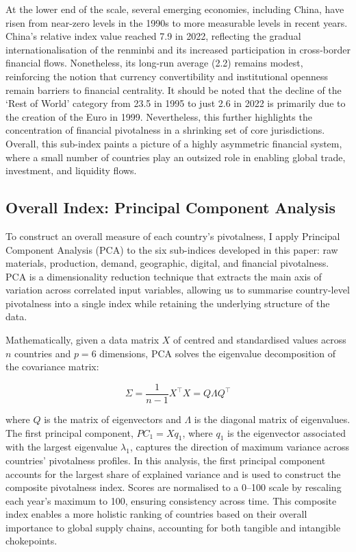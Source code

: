 \documentclass[11pt]{article}
\begin{document}
At the lower end of the scale, several emerging economies, including China, have risen from near-zero levels in the 1990s to more measurable levels in recent years. China’s relative index value reached 7.9 in 2022, reflecting the gradual internationalisation of the renminbi and its increased participation in cross-border financial flows. Nonetheless, its long-run average (2.2) remains modest, reinforcing the notion that currency convertibility and institutional openness remain barriers to financial centrality. It should be noted that the decline of the ‘Rest of World’ category from 23.5 in 1995 to just 2.6 in 2022 is primarily due to the creation of the Euro in 1999. Nevertheless, this further highlights the concentration of financial pivotalness in a shrinking set of core jurisdictions. Overall, this sub-index paints a picture of a highly asymmetric financial system, where a small number of countries play an outsized role in enabling global trade, investment, and liquidity flows.

\subsection{Overall Index: Principal Component Analysis}
To construct an overall measure of each country’s pivotalness, I apply Principal Component Analysis (PCA) to the six sub-indices developed in this paper: raw materials, production, demand, geographic, digital, and financial pivotalness. PCA is a dimensionality reduction technique that extracts the main axis of variation across correlated input variables, allowing us to summarise country-level pivotalness into a single index while retaining the underlying structure of the data.

Mathematically, given a data matrix $X$ of centred and standardised values across $n$ countries and $p = 6$ dimensions, PCA solves the eigenvalue decomposition of the covariance matrix:

\begin{equation}
\Sigma = \frac{1}{n-1} X^\top X = Q \Lambda Q^\top
\end{equation}

where $Q$ is the matrix of eigenvectors and $\Lambda$ is the diagonal matrix of eigenvalues. The first principal component, $PC_1 = X q_1$, where $q_1$ is the eigenvector associated with the largest eigenvalue $\lambda_1$, captures the direction of maximum variance across countries’ pivotalness profiles. In this analysis, the first principal component accounts for the largest share of explained variance and is used to construct the composite pivotalness index. Scores are normalised to a 0–100 scale by rescaling each year’s maximum to 100, ensuring consistency across time. This composite index enables a more holistic ranking of countries based on their overall importance to global supply chains, accounting for both tangible and intangible chokepoints. 
\end{document}
